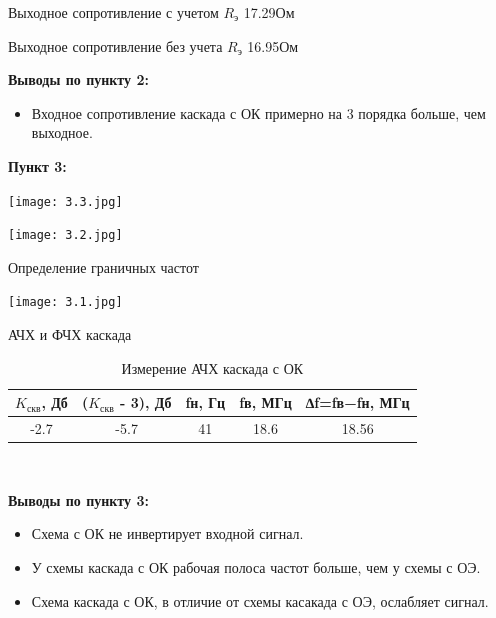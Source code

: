 \documentclass[a4paper,14pt]{extarticle}
\begin{document}
    Выходное сопротивление с учетом $R_{\text{э}}$ 17.29Ом

    Выходное сопротивление без учета $R_{\text{э}}$ 16.95Ом

    \textbf{Выводы по пункту 2:}
    \vspace{-6ex}
    \begin{singlespace}
        \begin{itemize}
            \item Входное сопротивление каскада с ОК примерно на 3 порядка больше, чем выходное.
        \end{itemize}
    \end{singlespace}

    \newpage 
    \textbf{Пункт 3:}
    \begin{center}
        \texttt{[image: 3.3.jpg]}
    \end{center}
    \begin{center}
        \texttt{[image: 3.2.jpg]}
    \end{center}
    \begin{center}
        Определение граничных частот
    \end{center}
    \begin{center}
        \texttt{[image: 3.1.jpg]}
    \end{center}
    \begin{center}
        АЧХ и ФЧХ каскада
    \end{center}

    \begin{table}[ht]
        \begin{center}
            \caption{Измерение АЧХ каскада с ОК}
            \begin{tabular}{ |c|c|c|c|c| }
                \hline
                $K_{\text{скв}}$, Дб & ($K_{\text{скв}}$ - 3), Дб&fн, Гц & fв, МГц & ∆f=fв−fн, МГц \\
                \hline 
                -2.7 & -5.7 & 41 & 18.6 & 18.56\\
                \hline
            \end{tabular}\\
        \end{center}
    \end{table}
    \textbf{Выводы по пункту 3:}
    \vspace{-6ex}
    \begin{singlespace}
        \begin{itemize}
            \item Схема с ОК не инвертирует входной сигнал.
            \item У схемы каскада с ОК рабочая полоса частот больше, чем у схемы с ОЭ.
            \item Схема каскада с ОК, в отличие от схемы касакада с ОЭ, ослабляет сигнал. 
        \end{itemize}
    \end{singlespace}
\end{document}
